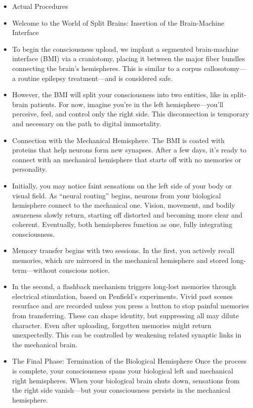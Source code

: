 \documentclass[10pt]{article}
\begin{document}
\begin{sloppypar}
\begin{itemize}
    \item Actual Procedures
    \item Welcome to the World of Split Brains: Insertion of the Brain-Machine Interface
    \item To begin the consciousness upload, we implant a segmented brain-machine interface (BMI) via a craniotomy, placing it between the major fiber bundles connecting the brain’s hemispheres. This is similar to a corpus callosotomy—a routine epilepsy treatment—and is considered safe.
    \item However, the BMI will split your consciousness into two entities, like in split-brain patients. For now, imagine you’re in the left hemisphere—you’ll perceive, feel, and control only the right side. This disconnection is temporary and necessary on the path to digital immortality.
    \item Connection with the Mechanical Hemisphere. The BMI is coated with proteins that help neurons form new synapses. After a few days, it’s ready to connect with an mechanical hemisphere that starts off with no memories or personality.
    \item Initially, you may notice faint sensations on the left side of your body or visual field. As “neural routing” begins, neurons from your biological hemisphere connect to the mechanical one. Vision, movement, and bodily awareness slowly return, starting off distorted and becoming more clear and coherent. Eventually, both hemispheres function as one, fully integrating consciousness.
    \item Memory transfer begins with two sessions. In the first, you actively recall memories, which are mirrored in the mechanical hemisphere and stored long-term—without conscious notice.
    \item In the second, a flashback mechanism triggers long-lost memories through electrical stimulation, based on Penfield’s experiments. Vivid past scenes resurface and are recorded unless you press a button to stop painful memories from transferring. These can shape identity, but suppressing all may dilute character. Even after uploading, forgotten memories might return unexpectedly. This can be controlled by weakening related synaptic links in the mechanical brain.
    \item The Final Phase: Termination of the Biological Hemisphere Once the process is complete, your consciousness spans your biological left and mechanical right hemispheres. When your biological brain shuts down, sensations from the right side vanish—but your consciousness persists in the mechanical hemisphere.

\end{itemize}
\end{sloppypar}
\end{document}
